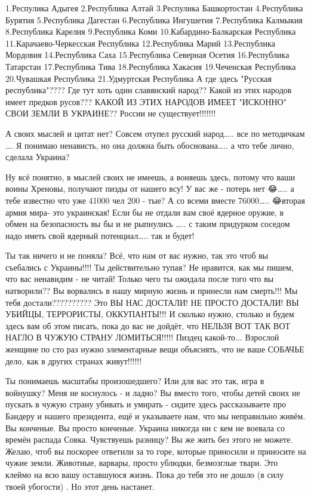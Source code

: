 1.Респулика Адыгея
2.Республика Алтай
3.Респулика Башкортостан
4.Республика Бурятия
5.Республика Дагестан
6.Республика Ингушетия
7.Республика Калмыкия
8.Республика Карелия
9.Республика Коми
10.Кабардино-Балкарская Республика
11.Карачаево-Черкесская Республика
12.Республика Марий
13.Республика Мордовия
14.Республика Саха
15.Республика Северная Осетия
16.Республика Татарстан
17.Республика Тива
18.Республика Хакасия
19.Чеченская Республика
20.Чувашкая Республика
21.Удмуртская Республика
А где здесь "Русская республика"????
Где тут хоть один славянский народ??
Какой из этих народов имеет предков русов???
КАКОЙ ИЗ ЭТИХ НАРОДОВ ИМЕЕТ "ИСКОННО" СВОИ ЗЕМЛИ В УКРАИНЕ??
России не существует!!!!!!!

А своих мыслей и цитат нет? Совсем отупел русский народ….. все по методичкам ….
Я понимаю ненависть, но она должна быть обоснована….. а что тебе лично, сделала
Украина?

Ну всё понятно, в мыслей своих не имеешь, а воняешь здесь, потому что ваши
воины Хреновы, получают пизды от нашего всу! У вас же - потерь нет 😂….. а тебе
известно что уже 41000 чел 200 - тые? А со всеми вместе 76000….. 😂вторая армия
мира- это украинская! Если бы не отдали вам своё ядерное оружие, в обмен на
безопасность вы бы и не рыпнулись ….. с таким придурком соседом надо иметь свой
ядерный потенциал….. так и будет!

Ты так ничего и не поняла? Всё, что нам от вас нужно, так это чтоб вы съебались
с Украины!!!! Ты действительно тупая? Не нравится, как мы пишем, что вас
ненавидим - не читай! Только чего ты ожидала после того что вы натворили?? Вы
ворвались в нашу мирную жизнь и принесли нам смерть!!! Мы тебя
достали?????????? Это ВЫ НАС ДОСТАЛИ! НЕ ПРОСТО ДОСТАЛИ! ВЫ УБИЙЦЫ, ТЕРРОРИСТЫ,
ОККУПАНТЫ!!! И сколько нужно, столько и будем здесь вам об этом писать, пока до
вас не дойдёт, что НЕЛЬЗЯ ВОТ ТАК ВОТ НАГЛО В ЧУЖУЮ СТРАНУ ЛОМИТЬСЯ!!!!! Пиздец
какой-то... Взрослой женщине по сто раз нужно элементарные вещи объяснять, что
не ваше СОБАЧЬЕ дело, как в других странах живут!!!!!!

Ты понимаешь масштабы произошедшего? Или для вас это так, игра в войнушку? Меня
не коснулось - и ладно? Вы вместо того, чтобы детей своих не пускать в чужую
страну убивать и умирать - сидите здесь рассказываете про Бандеру и нашего
президента, ещё и указываете нам, что мы неправильно живём. Вы конченые. Вы
просто конченые. Украина никогда ни с кем не воевала со времён распада Совка.
Чувствуешь разницу? Вы же жить без этого не можете. Желаю, чтоб вы поскорее
ответили за то горе, которые приносили и приносите на чужие земли. Животные,
варвары, просто ублюдки, безмозглые твари. Это клеймо на всю вашу оставшуюся
жизнь. Пока до тебя это не дошло (в силу твоей убогости) . Но этот день
настанет.

